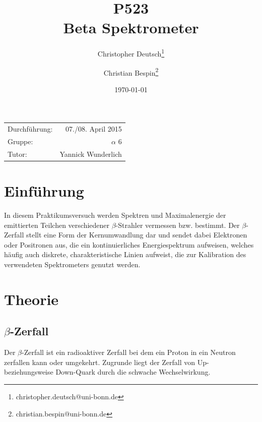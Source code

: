 \documentclass[11pt, a4paper]{article}
\title{P523 \\ Beta Spektrometer}
\author{Christopher Deutsch\footnote{christopher.deutsch@uni-bonn.de} \and Christian Bespin\footnote{christian.bespin@uni-bonn.de}}
\date{\today}
\numberwithin{equation}{section}
\begin{document}
\begin{titlepage}

\maketitle

\begin{center}
\begin{tabular}{l r}
Durchführung: & 07./08. April 2015 \\
Gruppe: & $\alpha$ 6 \\
Tutor: & Yannick Wunderlich
\end{tabular}
\end{center}

\begin{abstract}
\noindent
\end{abstract}

\end{titlepage}

\tableofcontents
\newpage


\section{Einführung}

In diesem Praktikumsversuch werden Spektren und Maximalenergie der emittierten Teilchen verschiedener $\beta$-Strahler vermessen bzw. bestimmt.
Der $\beta$-Zerfall stellt eine Form der Kernumwandlung dar und sendet dabei Elektronen oder Positronen aus, die ein kontinuierliches Energiespektrum aufweisen, welches häufig auch diskrete, charakteristische Linien aufweist, die zur Kalibration des verwendeten Spektrometers genutzt werden.

\section{Theorie}
\subsection{$\beta$-Zerfall}
Der $\beta$-Zerfall ist ein radioaktiver Zerfall bei dem ein Proton in ein Neutron zerfallen kann oder umgekehrt.
Zugrunde liegt der Zerfall von Up- beziehungsweise Down-Quark durch die schwache Wechselwirkung.
\end{document}
